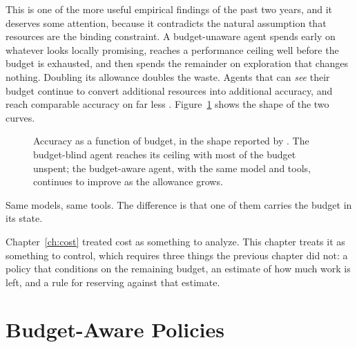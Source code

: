 \documentclass[11pt]{book}
\begin{document}
This is one of the more useful empirical findings of the past two years, and it deserves some attention, because it contradicts the natural assumption that resources are the binding constraint. A budget-unaware agent spends early on whatever looks locally promising, reaches a performance ceiling well before the budget is exhausted, and then spends the remainder on exploration that changes nothing. Doubling its allowance doubles the waste. Agents that can \textit{see} their budget continue to convert additional resources into additional accuracy, and reach comparable accuracy on far less \cite{bats2025, budgettooluse2026}. Figure~\ref{fig:budget-scaling} shows the shape of the two curves.

\begin{figure}[htbp]
\centering
{}
\caption{Accuracy as a function of budget, in the shape reported by \cite{bats2025, budgettooluse2026}. The budget-blind agent reaches its ceiling with most of the budget unspent; the budget-aware agent, with the same model and tools, continues to improve as the allowance grows.}
\label{fig:budget-scaling}
\end{figure}

Same models, same tools. The difference is that one of them carries the budget in its state.

Chapter~\ref{ch:cost} treated cost as something to analyze. This chapter treats it as something to control, which requires three things the previous chapter did not: a policy that conditions on the remaining budget, an estimate of how much work is left, and a rule for reserving against that estimate.

\section{Budget-Aware Policies}
\end{document}
